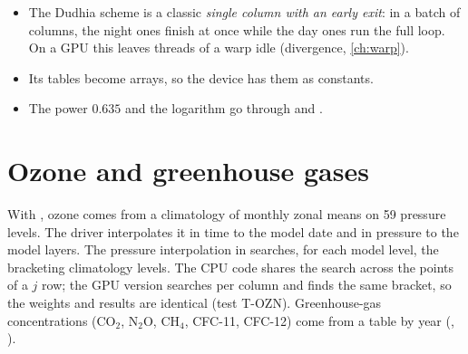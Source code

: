 \begin{portnote}
\begin{itemize}
  \item The Dudhia scheme is a classic \emph{single column with an early exit}: in a batch of columns, the night ones
    finish at once while the day ones run the full loop. On a GPU this leaves threads of a warp idle (divergence,
    \cref{ch:warp}).
  \item Its  tables become  arrays, so the device has them as constants.
  \item The power $0.635$ and the logarithm go through  and .
\end{itemize}
\end{portnote}

\section{Ozone and greenhouse gases}

With , ozone comes from a climatology of monthly zonal means on 59 pressure levels. The driver
interpolates it in time to the model date and in pressure to the model layers. The pressure interpolation in
 searches, for each model level, the bracketing climatology levels. The CPU code shares the search
across the points of a $j$ row; the GPU version searches per column and finds the same bracket, so the weights and
results are identical (test T-OZN). Greenhouse-gas concentrations (CO$_2$, N$_2$O, CH$_4$, CFC-11, CFC-12) come from a
table by year (, ).
